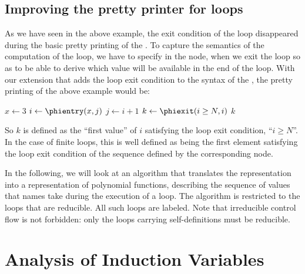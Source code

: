 {\subsection{Improving the \SSA{} pretty printer for loops}
As we have seen in the above example, the exit condition of the loop disappeared during the basic pretty printing of the \SSA{}. 
To capture the semantics of the computation of the loop, we have to specify in the \closephi{} node, when we exit the loop so as to be able to derive which value will be available in the end of the loop. 
With our extension that adds the loop exit condition to the syntax of the \closephi{}, the \SSA{} pretty printing of the above example would be:

\begin{algorithm}[H]
$x\gets 3$\;
$i\gets \phientry(x,j)$\;
$j\gets i+1$\;
$k\gets\phiexit(i\geq N, i)$\;
\Return $k$\;
\end{algorithm}

So $k$ is defined as the ``first value'' of $i$ satisfying the loop
exit condition, ``$i \geq N$''.  In the case of finite loops, this is well defined as being the first element satisfying the loop exit condition of the sequence defined by the corresponding \loopphi{} node.

In the following, we will look at an algorithm that translates the
\SSA{} representation into a representation of polynomial functions,
describing the sequence of values that \SSA{} names take during the execution of a loop. 
The algorithm is restricted to the loops that are reducible. 
All such loops are labeled. 
Note that irreducible control flow is not forbidden: 
only the loops carrying self-definitions must be reducible.

\section{Analysis of Induction Variables}

}
